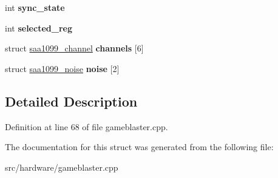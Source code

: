 \begin{DoxyCompactItemize}
\item 
\hypertarget{structSAA1099_a3c15d03b0d5d74a3ec0d99950aef13b7}{int {\bfseries sync\-\_\-state}}\label{structSAA1099_a3c15d03b0d5d74a3ec0d99950aef13b7}

\item 
\hypertarget{structSAA1099_ab383e3a54b6f2a3fddde5edfb34d0643}{int {\bfseries selected\-\_\-reg}}\label{structSAA1099_ab383e3a54b6f2a3fddde5edfb34d0643}

\item 
\hypertarget{structSAA1099_a19492862189267cfdab20ba34f24584e}{struct \hyperlink{structsaa1099__channel}{saa1099\-\_\-channel} {\bfseries channels} \mbox{[}6\mbox{]}}\label{structSAA1099_a19492862189267cfdab20ba34f24584e}

\item 
\hypertarget{structSAA1099_a2315be284814cee2ce14fda63bcb7f58}{struct \hyperlink{structsaa1099__noise}{saa1099\-\_\-noise} {\bfseries noise} \mbox{[}2\mbox{]}}\label{structSAA1099_a2315be284814cee2ce14fda63bcb7f58}

\end{DoxyCompactItemize}


\subsection{Detailed Description}


Definition at line 68 of file gameblaster.\-cpp.



The documentation for this struct was generated from the following file\-:\begin{DoxyCompactItemize}
\item 
src/hardware/gameblaster.\-cpp\end{DoxyCompactItemize}
